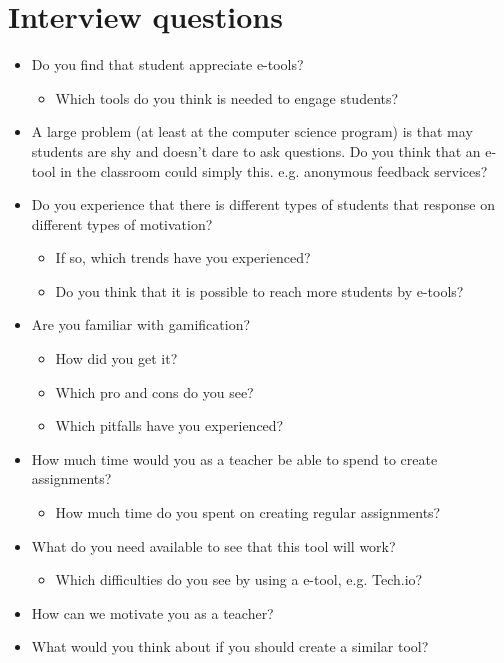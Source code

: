 \chapter{Interview questions}\label{Interview:questions} 

\begin{itemize}
 \item Do you find that student appreciate e-tools?
 \begin{itemize}
 \item Which tools do you think is needed to engage students?
 \end{itemize}
 
 \item A large problem (at least at the computer science program) is that may students are shy and doesn't dare to ask questions. Do you think that an e-tool in the classroom could simply this. e.g. anonymous feedback services? 

 
 \item Do you experience that there is different types of students that response on different types of motivation?
 \begin{itemize}
 \item If so, which trends have you experienced?
 \item Do you think that it is possible to reach more students by e-tools?
 \end{itemize}
 
 \item Are you familiar with gamification?
 \begin{itemize}
 \item How did you get it?
 \item Which pro and cons do you see?
 \item Which pitfalls have you experienced?
 \end{itemize}
 
 \item  How much time would you as a teacher be able to spend to create assignments?
 \begin{itemize}
 \item How much time do you spent on creating regular assignments?
 \end{itemize}
 
 \item What do you need available to see that this tool will work?
 \begin{itemize}
 \item Which difficulties do you see by using a e-tool, e.g. Tech.io?
 \end{itemize}
\item How can we motivate you as a teacher?
\item What would you think about if you should create a similar tool?

\end{itemize}
